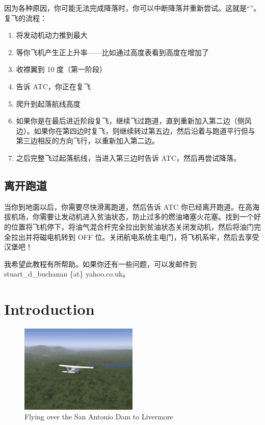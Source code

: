 因为各种原因，你可能无法完成降落时，你可以中断降落并重新尝试。这就是“”。复飞的流程：

\begin{enumerate}

\item 将发动机动力推到最大
\item 等你飞机产生正上升率——比如通过高度表看到高度在增加了
\item 收襟翼到 10 度（第一阶段）
\item 告诉 ATC，你正在复飞
\item 爬升到起落航线高度
\item 如果你是在最后进近阶段复飞，继续飞过跑道，直到重新加入第二边（侧风边）。如果你在第四边时复飞，则继续转过第五边，然后沿着与跑道平行但与第三边相反的方向飞行，以重新加入第二边。
\item 之后完整飞过起落航线，当进入第三边时告诉 ATC，然后再尝试降落。
\end{enumerate}

\subsection{离开跑道}

当你到地面以后，你需要尽快滑离跑道，然后告诉 ATC 你已经离开跑道。在高海拔机场，你需要让发动机进入贫油状态，防止过多的燃油堵塞火花塞。找到一个好的位置将飞机停下，将油气混合杆完全拉出到贫油状态关闭发动机，然后将油门完全拉出并将磁电机转到 OFF 位。关闭航电系统主电门，将飞机系牢，然后去享受汉堡吧！

我希望此教程有所帮助。如果你还有一些问题，可以发邮件到 stuart\_d\_buchanan \{at\} yahoo.co.uk。

\iffalse
\section{Introduction}

\begin{figure}[!htp]
\centering
\includegraphics[width=0.5\textwidth]{antonio2}
\caption{Flying over the San Antonio Dam to Livermore}
\end{figure}

